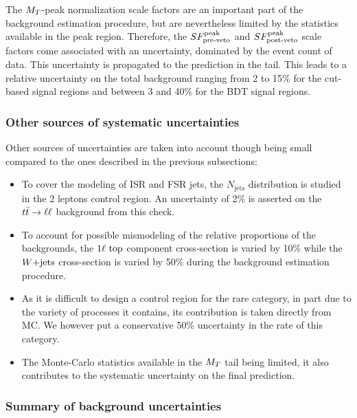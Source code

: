     The $M_T$-peak normalization scale factors are an important part of the background
    estimation procedure, but are nevertheless limited by the statistics available
    in the peak region. Therefore, the $SF_{\text{pre-veto}}^{\text{peak}}$ and $SF_{\text{post-veto}}^{\text{peak}}$ scale factors come
    associated with an uncertainty, dominated by the event count of data. This
    uncertainty is propagated to the prediction in the tail. This leads to a
    relative uncertainty on the total background ranging from 2 to 15\% for the
    cut-based signal regions and between 3 and 40\% for the BDT signal regions.

    \subsubsection{Other sources of systematic uncertainties}

    Other sources of uncertainties are taken into account though being small compared
    to the ones described in the previous subsections:
    \begin{itemize}
        \item To cover the modeling of ISR and FSR jets, the $N_\text{jets}$
              distribution is studied in the 2 leptons control region. An
              uncertainty of 2\% is asserted on the $t\bar{t} \rightarrow \ell \ell$ background
              from this check.
        \item To account for possible mismodeling of the relative proportions of
              the backgrounds, the $1\ell~\text{top}$ component cross-section
              is varied by 10\% while the $\text{$W$+jets}$ cross-section is varied by 50\%
              during the background estimation procedure.
        \item As it is difficult to design a control region for the rare category,
              in part due to the variety of processes it contains, its contribution
              is taken directly from MC. We however put a conservative 50\% uncertainty
              in the rate of this category.
        \item The Monte-Carlo statistics available in the $M_T$ tail being limited,
              it also contributes to the systematic uncertainty on the final prediction.
    \end{itemize}

    \subsubsection{Summary of background uncertainties}

